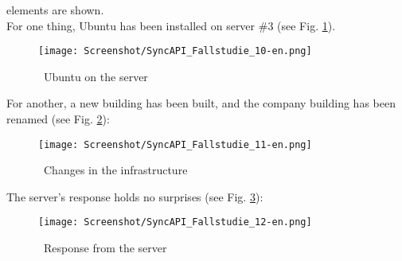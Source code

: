 \documentclass[a4paper,10pt]{book}
\begin{document}
elements are shown.
\newline\\
For one thing, Ubuntu has been installed on server \#3 (see Fig. \ref{Ubuntu on the server}).
\newline
\begin{figure}[htb!]
  \centering
  \texttt{[image: Screenshot/SyncAPI\_Fallstudie\_10-en.png]}
  \caption{\label{Ubuntu on the server} \ Ubuntu on the server}
\end{figure}
\newline
For another, a new building has been built, and the company building has been renamed (see Fig. \ref{Changes in the infrastructure}):
\newline
\begin{figure}[htb!]
  \centering
  \texttt{[image: Screenshot/SyncAPI\_Fallstudie\_11-en.png]}
  \caption{\label{Changes in the infrastructure} \ Changes in the infrastructure}
\end{figure}
\newline
The server's response holds no surprises (see Fig. \ref{Response from the server}):
\newline
\begin{figure}[htb!]
  \centering
  \texttt{[image: Screenshot/SyncAPI\_Fallstudie\_12-en.png]}
  \caption{\label{Response from the server} \ Response from the server}
\end{figure}
\newline
\end{document}
